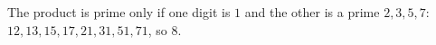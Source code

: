 The product is prime only if one digit is $1$ and the other is a prime $2,3,5,7$: $12,13,15,17,21,31,51,71$, so $\boxed{8}$.
